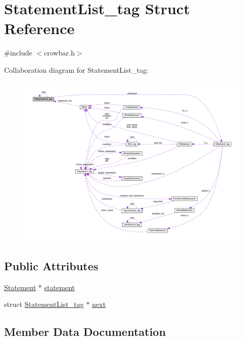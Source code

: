 \hypertarget{struct_statement_list__tag}{}\section{Statement\+List\+\_\+tag Struct Reference}
\label{struct_statement_list__tag}


{\ttfamily \#include $<$crowbar.\+h$>$}



Collaboration diagram for Statement\+List\+\_\+tag\+:\nopagebreak
\begin{figure}[H]
\begin{center}
\leavevmode
\includegraphics[width=350pt]{struct_statement_list__tag__coll__graph}
\end{center}
\end{figure}
\subsection*{Public Attributes}
\begin{DoxyCompactItemize}
\item 
\hyperlink{crowbar_8h_a16fe74a7a87df7652e815d139b3349d2}{Statement} $\ast$ \hyperlink{struct_statement_list__tag_af8e00b3cdbd4364e5c5c23896df4697d}{statement}
\item 
struct \hyperlink{struct_statement_list__tag}{Statement\+List\+\_\+tag} $\ast$ \hyperlink{struct_statement_list__tag_a1e3b82b453a9f9d654c0d6b5313009be}{next}
\end{DoxyCompactItemize}


\subsection{Member Data Documentation}
\hypertarget{struct_statement_list__tag_a1e3b82b453a9f9d654c0d6b5313009be}{}
